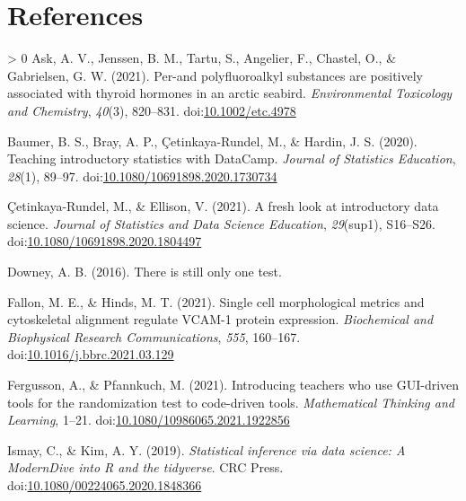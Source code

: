 \documentclass[10pt,a4paper,onecolumn]{article}
\newlength{\cslhangindent}
\newenvironment{CSLReferences}[3] %
 {%
  \setlength{\parindent}{0pt}
  \ifodd #1 \everypar{\setlength{\hangindent}{\cslhangindent}}\ignorespaces\fi
  \ifnum #2 > 0
  \setlength{\parskip}{#2\baselineskip}
  \fi
 }%
 {}
\begin{document}
\hypertarget{references}{%
\section*{References}\label{references}}

\hypertarget{refs}{}
\begin{CSLReferences}{1}{0}
\leavevmode\hypertarget{ref-ask2021per}{}%
Ask, A. V., Jenssen, B. M., Tartu, S., Angelier, F., Chastel, O., \&
Gabrielsen, G. W. (2021). Per-and polyfluoroalkyl substances are
positively associated with thyroid hormones in an arctic seabird.
\emph{Environmental Toxicology and Chemistry}, \emph{40}(3), 820--831.
doi:\href{https://doi.org/10.1002/etc.4978}{10.1002/etc.4978}

\leavevmode\hypertarget{ref-baumer2020teaching}{}%
Baumer, B. S., Bray, A. P., Çetinkaya-Rundel, M., \& Hardin, J. S.
(2020). Teaching introductory statistics with DataCamp. \emph{Journal of
Statistics Education}, \emph{28}(1), 89--97.
doi:\href{https://doi.org/10.1080/10691898.2020.1730734}{10.1080/10691898.2020.1730734}

\leavevmode\hypertarget{ref-cetinkaya2021fresh}{}%
Çetinkaya-Rundel, M., \& Ellison, V. (2021). A fresh look at
introductory data science. \emph{Journal of Statistics and Data Science
Education}, \emph{29}(sup1), S16--S26.
doi:\href{https://doi.org/10.1080/10691898.2020.1804497}{10.1080/10691898.2020.1804497}

\leavevmode\hypertarget{ref-downey2016}{}%
Downey, A. B. (2016). There is still only one test.

\leavevmode\hypertarget{ref-fallon2021single}{}%
Fallon, M. E., \& Hinds, M. T. (2021). Single cell morphological metrics
and cytoskeletal alignment regulate VCAM-1 protein expression.
\emph{Biochemical and Biophysical Research Communications}, \emph{555},
160--167.
doi:\href{https://doi.org/10.1016/j.bbrc.2021.03.129}{10.1016/j.bbrc.2021.03.129}

\leavevmode\hypertarget{ref-fergusson2021introducing}{}%
Fergusson, A., \& Pfannkuch, M. (2021). Introducing teachers who use
GUI-driven tools for the randomization test to code-driven tools.
\emph{Mathematical Thinking and Learning}, 1--21.
doi:\href{https://doi.org/10.1080/10986065.2021.1922856}{10.1080/10986065.2021.1922856}

\leavevmode\hypertarget{ref-ismay2019statistical}{}%
Ismay, C., \& Kim, A. Y. (2019). \emph{Statistical inference via data
science: A ModernDive into {R} and the tidyverse}. CRC Press.
doi:\href{https://doi.org/10.1080/00224065.2020.1848366}{10.1080/00224065.2020.1848366}


\end{CSLReferences}
\end{document}
